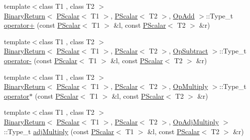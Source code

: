 \begin{DoxyCompactItemize}
\item 
{\footnotesize template$<$class T1 , class T2 $>$ }\\\mbox{\hyperlink{structENSEM_1_1BinaryReturn}{Binary\+Return}}$<$ \mbox{\hyperlink{classENSEM_1_1PScalar}{P\+Scalar}}$<$ T1 $>$, \mbox{\hyperlink{classENSEM_1_1PScalar}{P\+Scalar}}$<$ T2 $>$, \mbox{\hyperlink{structENSEM_1_1OpAdd}{Op\+Add}} $>$\+::Type\+\_\+t \mbox{\hyperlink{group__primscalar_ga6cdeef7aca88574749d835692921d6e6}{operator+}} (const \mbox{\hyperlink{classENSEM_1_1PScalar}{P\+Scalar}}$<$ T1 $>$ \&l, const \mbox{\hyperlink{classENSEM_1_1PScalar}{P\+Scalar}}$<$ T2 $>$ \&r)
\item 
{\footnotesize template$<$class T1 , class T2 $>$ }\\\mbox{\hyperlink{structENSEM_1_1BinaryReturn}{Binary\+Return}}$<$ \mbox{\hyperlink{classENSEM_1_1PScalar}{P\+Scalar}}$<$ T1 $>$, \mbox{\hyperlink{classENSEM_1_1PScalar}{P\+Scalar}}$<$ T2 $>$, \mbox{\hyperlink{structENSEM_1_1OpSubtract}{Op\+Subtract}} $>$\+::Type\+\_\+t \mbox{\hyperlink{group__primscalar_gad6a80202334f9602e241a71a58828d69}{operator-\/}} (const \mbox{\hyperlink{classENSEM_1_1PScalar}{P\+Scalar}}$<$ T1 $>$ \&l, const \mbox{\hyperlink{classENSEM_1_1PScalar}{P\+Scalar}}$<$ T2 $>$ \&r)
\item 
{\footnotesize template$<$class T1 , class T2 $>$ }\\\mbox{\hyperlink{structENSEM_1_1BinaryReturn}{Binary\+Return}}$<$ \mbox{\hyperlink{classENSEM_1_1PScalar}{P\+Scalar}}$<$ T1 $>$, \mbox{\hyperlink{classENSEM_1_1PScalar}{P\+Scalar}}$<$ T2 $>$, \mbox{\hyperlink{structENSEM_1_1OpMultiply}{Op\+Multiply}} $>$\+::Type\+\_\+t \mbox{\hyperlink{group__primscalar_ga73b8e82a534a7eb469fb90a9e25271df}{operator$\ast$}} (const \mbox{\hyperlink{classENSEM_1_1PScalar}{P\+Scalar}}$<$ T1 $>$ \&l, const \mbox{\hyperlink{classENSEM_1_1PScalar}{P\+Scalar}}$<$ T2 $>$ \&r)
\item 
{\footnotesize template$<$class T1 , class T2 $>$ }\\\mbox{\hyperlink{structENSEM_1_1BinaryReturn}{Binary\+Return}}$<$ \mbox{\hyperlink{classENSEM_1_1PScalar}{P\+Scalar}}$<$ T1 $>$, \mbox{\hyperlink{classENSEM_1_1PScalar}{P\+Scalar}}$<$ T2 $>$, \mbox{\hyperlink{structENSEM_1_1OpAdjMultiply}{Op\+Adj\+Multiply}} $>$\+::Type\+\_\+t \mbox{\hyperlink{group__primscalar_gacd01dab554ff851aa1ca0012ec9accf0}{adj\+Multiply}} (const \mbox{\hyperlink{classENSEM_1_1PScalar}{P\+Scalar}}$<$ T1 $>$ \&l, const \mbox{\hyperlink{classENSEM_1_1PScalar}{P\+Scalar}}$<$ T2 $>$ \&r)
\item 

\end{DoxyCompactItemize}
